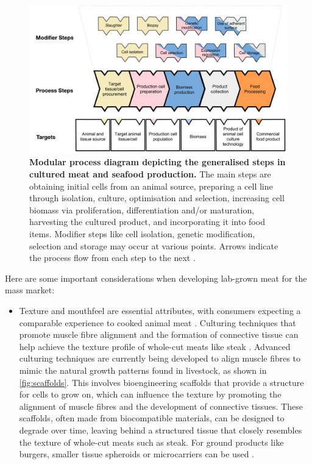 \documentclass[10pt]{article}
\begin{document}
\begin{sloppypar}
  \begin{figure}[ht]
    \centering
    \includegraphics[width=\textwidth]{figures/lab-grown-meat-step.png}
    \caption[Modular process diagram depicting the generalised steps in cultured meat and seafood production.]{\textbf{Modular process diagram depicting the generalised steps in cultured meat and seafood production.} The main steps are obtaining initial cells from an animal source, preparing a cell line through isolation, culture, optimisation and selection, increasing cell biomass via proliferation, differentiation and/or maturation, harvesting the cultured product, and incorporating it into food items. Modifier steps like cell isolation, genetic modification, selection and storage may occur at various points. Arrows indicate the process flow from each step to the next \citep{ong_food_2021}.}
    \label{fig:lab-grown-meat-process}
  \end{figure}

  Here are some important considerations when developing lab-grown meat for the mass market:

  \begin{itemize}
    \item Texture and mouthfeel are essential attributes, with consumers expecting a comparable experience to cooked animal meat \citep{datar_possibilities_2010}. Culturing techniques that promote muscle fibre alignment and the formation of connective tissue can help achieve the texture profile of whole-cut meats like steak \citep{post_cultured_2012}. Advanced culturing techniques are currently being developed to align muscle fibres to mimic the natural growth patterns found in livestock, as shown in \autoref{fig:scaffolds}. This involves bioengineering scaffolds that provide a structure for cells to grow on, which can influence the texture by promoting the alignment of muscle fibres and the development of connective tissues. These scaffolds, often made from biocompatible materials, can be designed to degrade over time, leaving behind a structured tissue that closely resembles the texture of whole-cut meats such as steak. For ground products like burgers, smaller tissue spheroids or microcarriers can be used \citep{specht_opportunities_2018}.


\end{itemize}
\end{sloppypar}
\end{document}
